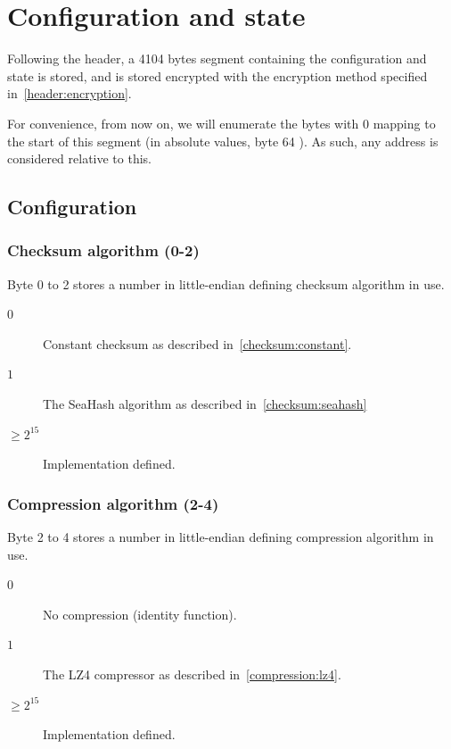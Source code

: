 \documentclass[11pt,a4paper]{report}
\newcommand{\clustersize}{4104 }
\newcommand{\diskheadersize}{64 }
\begin{document}
    \chapter{Configuration and state}
    Following the header, a \clustersize bytes segment containing the
    configuration and state is stored, and is stored encrypted with the
    encryption method specified in~\ref{header:encryption}.

    For convenience, from now on, we will enumerate the bytes with $0$ mapping
    to the start of this segment (in absolute values, byte \diskheadersize). As
    such, any address is considered relative to this.

    \section{Configuration}
        \subsection{Checksum algorithm (0-2)}
        \label{config:checksum}
        Byte 0 to 2 stores a number in little-endian defining checksum
        algorithm in use.

        \begin{description}
            \item [$0$] Constant checksum as described
                in~\ref{checksum:constant}.
            \item [$1$] The SeaHash algorithm as described
                in~\ref{checksum:seahash}
            \item [$\geq 2^{15}$] Implementation defined.
        \end{description}

        \subsection{Compression algorithm (2-4)}
        \label{config:compression}
        Byte 2 to 4 stores a number in little-endian defining compression
        algorithm in use.

        \begin{description}
            \item [$0$] No compression (identity function).
            \item [$1$] The LZ4 compressor as described
                in~\ref{compression:lz4}.
            \item [$\geq 2^{15}$] Implementation defined.
        \end{description}
\end{document}
